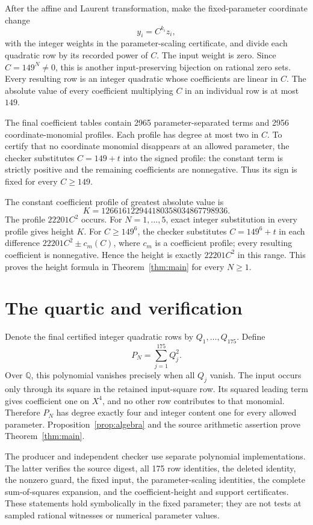 \documentclass[11pt,a4paper]{article}
\newcommand{\Q}{\mathbb Q}\newcommand{\Z}{\mathbb Z}
\begin{document}
After the affine and Laurent transformation, make the fixed-parameter
coordinate change
\[
 y_i=C^{k_i}z_i,
\]
with the integer weights in the parameter-scaling certificate, and
divide each quadratic row by its recorded power of $C$. The input
weight is zero. Since $C=149^N\ne0$, this is another
input-preserving bijection on rational zero sets.
Every resulting row is an integer quadratic whose coefficients are
linear in $C$. The absolute value of every coefficient multiplying
$C$ in an individual row is at most $149$.

The final coefficient tables contain 2965 parameter-separated terms
and 2956 coordinate-monomial profiles. Each profile has degree at most
two in $C$. To certify that no coordinate monomial disappears at an
allowed parameter, the checker substitutes $C=149+t$ into the signed
profile: the constant term is strictly positive and the remaining
coefficients are nonnegative. Thus its sign is fixed for every
$C\ge149$.

The constant coefficient profile of greatest absolute value is
\[
 K=126616122944180358034867798936.
\]
The profile $22201C^2$ occurs. For $N=1,\ldots,5$, exact integer
substitution in every profile gives height $K$. For $C\ge149^6$, the
checker substitutes $C=149^6+t$ in each difference
$22201C^2\pm c_m(C)$, where $c_m$ is a coefficient profile; every
resulting coefficient is nonnegative. Hence the height is exactly
$22201C^2$ in this range. This proves the height formula in
Theorem~\ref{thm:main} for every $N\ge1$.

\section{The quartic and verification}

Denote the final certified integer quadratic rows by
$Q_1,\ldots,Q_{175}$. Define
\[
                 P_N=\sum_{j=1}^{175}Q_j^2.
\]
Over $\Q$, this polynomial vanishes precisely when all $Q_j$ vanish.
The input occurs only through its square in the retained input-square
row. Its squared leading term gives coefficient one on $X^4$, and
no other row contributes to that monomial. Therefore $P_N$ has degree
exactly four and integer content one for every allowed parameter.
Proposition~\ref{prop:algebra} and the source arithmetic assertion
prove Theorem~\ref{thm:main}.

The producer and independent checker use separate polynomial
implementations. The latter verifies the source digest, all 175 row
identities, the deleted identity, the nonzero guard, the fixed input,
the parameter-scaling identities, the complete sum-of-squares
expansion, and the coefficient-height and support certificates. These statements hold
symbolically in the fixed parameter; they are not tests at sampled
rational witnesses or numerical parameter values.
\end{document}
